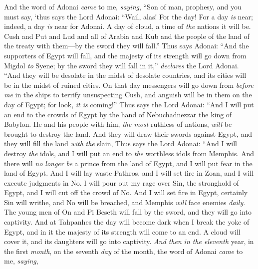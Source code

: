 \begin{biblechapter} %
 And the word of Adonai \textit{came} to me, \textit{saying},
\verse “Son of man, prophesy, and you must say, ‘thus says the Lord Adonai:
\verse “Wail, alas! For the day!
\verse For a day \textit{is} near; 
indeed, a day \textit{is} near for Adonai. 
A day of cloud, 
a time of \textit{the} nations it will be.
\verse Cush and Put and Lud and all of Arabia and Kub and the people of the land of the treaty with them—by the sword they will fall.”
\verse Thus says Adonai:
\verse “And the supporters of Egypt will fall, 
and the majesty of its strength will go down 
from Migdol \textit{to} Syene; 
by the sword they will fall in it,” 
\textit{declares} the Lord Adonai.
\verse “And they will be desolate in the midst of desolate countries, 
and its cities will be in the midst of ruined cities.
\verse On that day messengers will go down from \textit{before me} in the ships to terrify unsuspecting Cush, and anguish will be in them on the day of Egypt; for look, \textit{it is} coming!”
\verse Thus says the Lord Adonai:
\verse “And I will put an end to the crowds of Egypt 
by the hand of Nebuchadnezzar the king of Babylon.
\verse He and his people with him, \textit{the most} ruthless of nations, 
\textit{will} be brought to destroy the land. 
And they will draw their swords against Egypt, 
and they will fill the land \textit{with} \textit{the} slain,
\verse Thus says the Lord Adonai:
\verse “And I will destroy \textit{the} idols, 
and I will put an end to \textit{the} worthless idols from Memphis. 
And there will \textit{no longer be} a prince from the land of Egypt, 
and I will put fear in the land of Egypt.
\verse And I will lay waste Pathros, 
and I will set fire in Zoan, 
and I will execute judgments in No.
\verse I will pour out my rage over Sin, 
the stronghold of Egypt, 
and I will cut off the crowd of No.
\verse And I will set fire in Egypt, 
certainly Sin will writhe, 
and No will be breached, 
and Memphis \textit{will} face enemies \textit{daily}.
\verse The young men of On and Pi Beseth will fall by the sword, 
and they will go into captivity.
\verse And at Tahpanhes the day will become dark 
when I break the yoke of Egypt, 
and in it the majesty of its strength 
will come to an end. 
A cloud will cover it, 
and its daughters will go into captivity.
\verse \textit{And then} \textit{in the eleventh} year, in the first \textit{month}, on the seventh \textit{day} of the month, the word of Adonai \textit{came} to me, \textit{saying},

\end{biblechapter}
